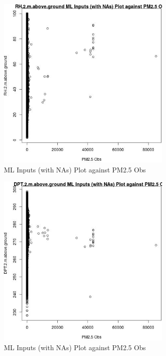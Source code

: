 \begin{figure} 
\centering  
\includegraphics[width=0.77\textwidth]{Code_Outputs/Report_ML_input_PM25_Step4_part_f_de_duplicated_aves_prioritize_24hr_obswNAs_RH2mabovegroundvPM25_Obs.jpg} 
\caption{\label{fig:Report_ML_input_PM25_Step4_part_f_de_duplicated_aves_prioritize_24hr_obswNAsRH2mabovegroundvPM25_Obs}ML Inputs (with NAs) Plot against PM2.5 Obs} 
\end{figure} 
 

\begin{figure} 
\centering  
\includegraphics[width=0.77\textwidth]{Code_Outputs/Report_ML_input_PM25_Step4_part_f_de_duplicated_aves_prioritize_24hr_obswNAs_DPT2mabovegroundvPM25_Obs.jpg} 
\caption{\label{fig:Report_ML_input_PM25_Step4_part_f_de_duplicated_aves_prioritize_24hr_obswNAsDPT2mabovegroundvPM25_Obs}ML Inputs (with NAs) Plot against PM2.5 Obs} 
\end{figure} 
 

